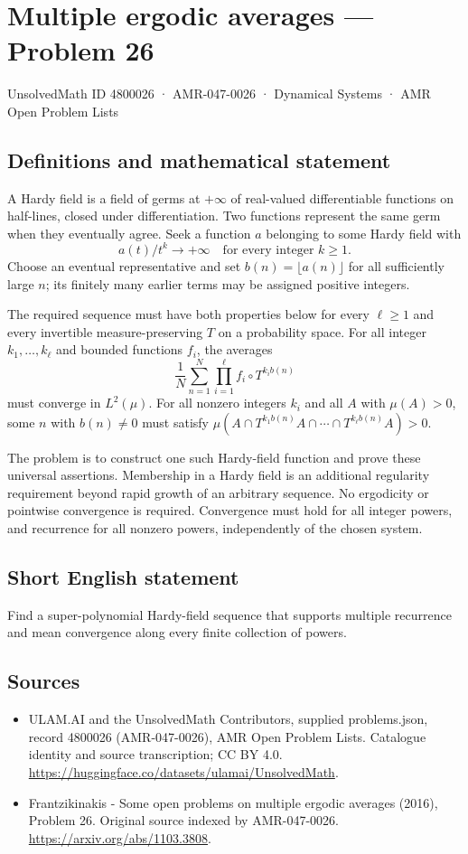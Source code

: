 \documentclass[11pt,a4paper]{article}
\begin{document}
\section*{Multiple ergodic averages — Problem 26}\label{4800026}
{\small UnsolvedMath ID 4800026 · AMR-047-0026 · Dynamical Systems · AMR Open Problem Lists}
\subsection{Definitions and mathematical statement}
A Hardy field is a field of germs at $+\infty$
of real-valued differentiable functions on half-lines,
closed under differentiation. Two functions represent
the same germ when they eventually agree. Seek
a function $a$ belonging to some Hardy field with
\[
                 a(t)/t^k\longrightarrow+\infty
                          \quad\text{for every integer }k\ge1.
\]
Choose an eventual representative and set
$b(n)=\lfloor a(n)\rfloor$ for all sufficiently
large $n$; its finitely many earlier terms may
be assigned positive integers.

The required sequence must have both properties
below for every $\ell\ge1$ and every invertible
measure-preserving $T$ on a probability space.
For all integer $k_1,\ldots,k_\ell$ and bounded
functions $f_i$, the averages
\[
           \frac1N\sum_{n=1}^N\prod_{i=1}^\ell
                           f_i\circ T^{k_i b(n)}
\]
must converge in $L^2(\mu)$. For all nonzero
integers $k_i$ and all $A$ with $\mu(A)>0$,
some $n$ with $b(n)\ne0$ must satisfy
$\mu(A\cap T^{k_1b(n)}A\cap\cdots\cap T^{k_\ell b(n)}A)>0$.

The problem is to construct one such Hardy-field
function and prove these universal assertions.
Membership in a Hardy field is an additional
regularity requirement beyond rapid growth of an
arbitrary sequence. No ergodicity or pointwise
convergence is required. Convergence must hold for
all integer powers, and recurrence for all nonzero
powers, independently of the chosen system.
\subsection{Short English statement}
Find a super-polynomial Hardy-field sequence that supports multiple recurrence and mean convergence along every finite collection of powers.
\subsection{Sources}
\begin{itemize}
\item[S1] ULAM.AI and the UnsolvedMath Contributors, supplied problems.json, record 4800026 (AMR-047-0026), AMR Open Problem Lists. Catalogue identity and source transcription; CC BY 4.0.
\url{https://huggingface.co/datasets/ulamai/UnsolvedMath}.
\item[S2] Frantzikinakis - Some open problems on multiple ergodic averages (2016), Problem 26. Original source indexed by AMR-047-0026.
\url{https://arxiv.org/abs/1103.3808}.
\end{itemize}
\end{document}
